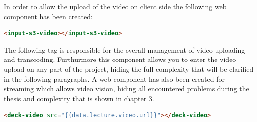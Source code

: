 In order to allow the upload of the video on client side the following web component has been created:

\begin{lstlisting}[language=html]
      <input-s3-video></input-s3-video>
\end{lstlisting}

The following tag is responsible for the overall management of video uploading and transcoding. Furthurmore this component allows you to enter the video upload on any part of the project, hiding the full complexity that will be clarified in the following paragraphs.
A web component has also been created for streaming which allows video vision, hiding all encountered problems during the thesis and complexity that is shown in chapter 3.

\begin{lstlisting}[language=html]
       <deck-video src="{{data.lecture.video.url}}"></deck-video>
\end{lstlisting}